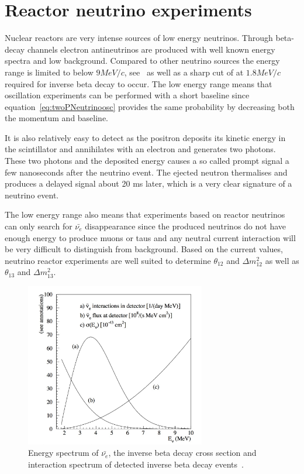 \pagebreak
\newpage
\FloatBarrier
\section{Reactor neutrino experiments}
Nuclear reactors are very intense sources of low energy neutrinos. Through beta-decay channels electron antineutrinos are produced with well known energy spectra and low background. Compared to other neutrino sources the energy range is limited to below $9 MeV/c$, see~ as well as a sharp cut of at $1.8 MeV/c$ required for inverse beta decay to occur. The low energy range means that oscillation experiments can be performed with a short baseline since equation~\ref{eq:twoPNeutrinoosc} provides the same probability by decreasing both the momentum and baseline.

It is also relatively easy to detect as the positron deposits its kinetic energy in the scintillator and annihilates with an electron and generates two photons. These two photons and the deposited energy causes a so called prompt signal a few nanoseconds after the neutrino event. The ejected neutron thermalises and produces a delayed signal about 20 ms later, which is a very clear signature of a neutrino event. 

The low energy range also means that experiments based on reactor neutrinos can only search for $\bar{\nu_e}$ disappearance since the produced neutrinos do not have enough energy to produce muons or taus and any neutral current interaction will be very difficult to distinguish from background. Based on the current values, neutrino reactor experiments are well suited to determine $\theta_{12}$ and $\Delta m_{12}^2 $ as well as  $\theta_{13}$ and $\Delta m_{13}^2$.

\begin{figure}[h!]
\centering
  \centering
\includegraphics[width=0.7\textwidth]{figures/reactor.jpeg}
\vspace{2mm}
\caption{Energy spectrum of $\bar{\nu_e}$, the inverse beta decay cross section and interaction spectrum of detected inverse beta decay events~\cite{65Reactor}.}
\label{fig:reactor}
\end{figure}

